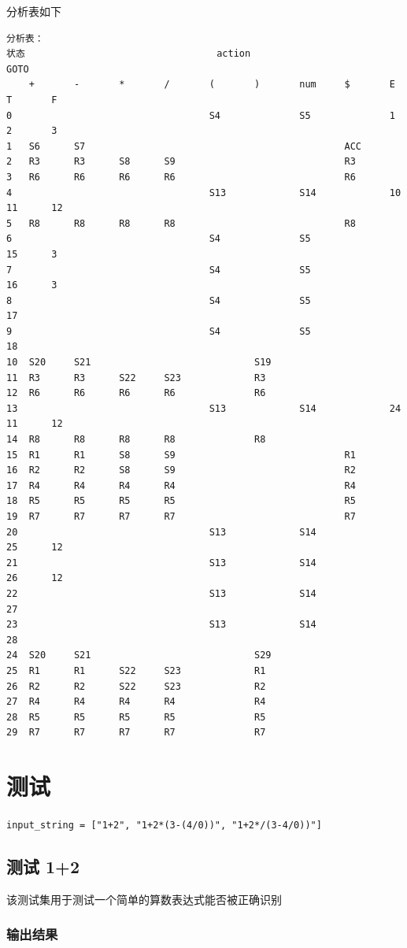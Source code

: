 \documentclass[lang=cn,11pt,a4paper]{elegantpaper}
\begin{document}
分析表如下
\begin{lstlisting}[language=text]
分析表：
状态									action								GOTO
	+		-		*		/		(		)		num		$		E		T		F		
0									S4				S5				1		2		3		
1	S6		S7												ACC								
2	R3		R3		S8		S9								R3								
3	R6		R6		R6		R6								R6								
4									S13				S14				10		11		12		
5	R8		R8		R8		R8								R8								
6									S4				S5						15		3		
7									S4				S5						16		3		
8									S4				S5								17		
9									S4				S5								18		
10	S20		S21								S19												
11	R3		R3		S22		S23				R3												
12	R6		R6		R6		R6				R6												
13									S13				S14				24		11		12		
14	R8		R8		R8		R8				R8												
15	R1		R1		S8		S9								R1								
16	R2		R2		S8		S9								R2								
17	R4		R4		R4		R4								R4								
18	R5		R5		R5		R5								R5								
19	R7		R7		R7		R7								R7								
20									S13				S14						25		12		
21									S13				S14						26		12		
22									S13				S14								27		
23									S13				S14								28		
24	S20		S21								S29												
25	R1		R1		S22		S23				R1												
26	R2		R2		S22		S23				R2												
27	R4		R4		R4		R4				R4												
28	R5		R5		R5		R5				R5												
29	R7		R7		R7		R7				R7												

\end{lstlisting}

\section{测试}

\lstinline{input_string = ["1+2", "1+2*(3-(4/0))", "1+2*/(3-4/0))"]}


\subsection{测试 1+2}
该测试集用于测试一个简单的算数表达式能否被正确识别

\subsubsection{输出结果}
\end{document}
